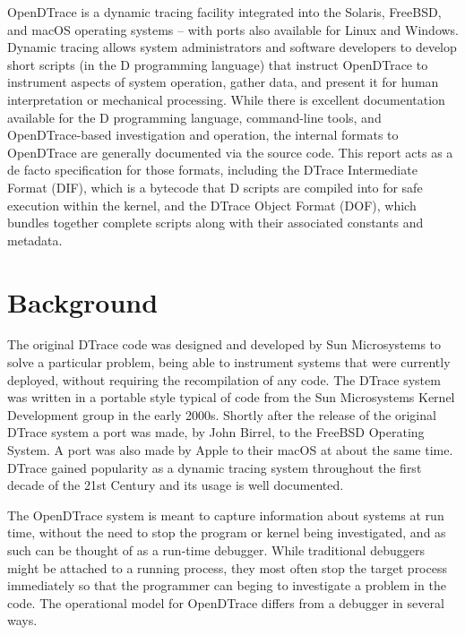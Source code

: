 OpenDTrace is a dynamic tracing facility integrated into the Solaris,
FreeBSD, and macOS operating systems -- with ports also available for
Linux and Windows.  Dynamic tracing allows system administrators and
software developers to develop short scripts (in the D programming
language) that instruct OpenDTrace to instrument aspects of system
operation, gather data, and present it for human interpretation or
mechanical processing.  While there is excellent documentation
available for the D programming language, command-line tools, and
OpenDTrace-based investigation and operation, the internal formats to
OpenDTrace are generally documented via the source code.  This report
acts as a de facto specification for those formats, including the
DTrace Intermediate Format (DIF), which is a bytecode that D scripts
are compiled into for safe execution within the kernel, and the DTrace
Object Format (DOF), which bundles together complete scripts along
with their associated constants and metadata.

\section{Background}

The original DTrace code was designed and developed by Sun
Microsystems to solve a particular problem, being able to instrument
systems that were currently deployed, without requiring the
recompilation of any code\cite{DTrace2004}.  The DTrace system was
written in a portable style typical of code from the Sun Microsystems
Kernel Development group in the early 2000s.  Shortly after the
release of the original DTrace system a port was made, by John Birrel,
to the FreeBSD Operating System.  A port was also made by Apple to
their macOS at about the same time.  DTrace gained popularity as a
dynamic tracing system throughout the first decade of the 21st Century
and its usage is well
documented\cite{mckusick2014design}\cite{Microsystems2008a}\cite{Gregg:2011:DDT:1971960}.

The OpenDTrace system is meant to capture information about systems at
run time, without the need to stop the program or kernel being
investigated, and as such can be thought of as a run-time debugger.
While traditional debuggers might be attached to a running process,
they most often stop the target process immediately so that the
programmer can beging to investigate a problem in the code.  The
operational model for OpenDTrace differs from a debugger in several
ways.

